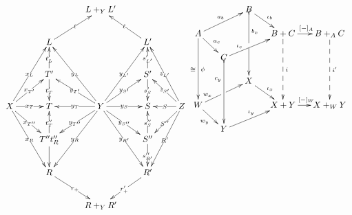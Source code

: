 \documentclass[12pt]{article}
\renewcommand{\(}{\left(}
\renewcommand{\)}{\right)}
\renewcommand{\{}{\left\lbrace}
\renewcommand{\}}{\right\rbrace}
\theoremstyle{remark}
\theoremstyle{definition}
\begin{document}
	\[
	\xymatrix{
		{} &
		{} &
		L+_YL' &
		{} &
		{} \\
		{} &
		L  
		\ar[ru]|{\ell} &
		{} &
		L' 
		\ar[lu]|{\ell}&
		{} \\
		{} &
		T' 
		\ar[u]|{t'_L}
		\ar[d]|{t'_T} &
		{} &
		S' 
		\ar[u]|{s'_{L'}}
		\ar[d]|{s'_S}&
		{} \\
		X 
		\ar[ruu]|{x_L}
		\ar[ru]|{x_{T'}}
		\ar[r]|{x_T}
		\ar[rd]|{x_{T''}}
		\ar[rdd]|{x_R}&
		T &
		Y 
		\ar[luu]|{y_{L}}
		\ar[lu]|{y_{T'}}
		\ar[l]|{y_{T}}
		\ar[ld]|{y_{T''}}
		\ar[ldd]|{y_{R}}
		\ar[ruu]|{y_{L'}}
		\ar[ru]|{y_{S'}}
		\ar[r]|{y_{S}}
		\ar[rd]|{y_{S''}}
		\ar[rdd]|{y_{R'}} &
		S &
		Z 
		\ar[luu]|{z_{L'}}
		\ar[lu]|{z_{S'}}
		\ar[l]|{S}
		\ar[ld]|{S''}
		\ar[ldd]|{R'}\\
		{} &
		T'' 
		\ar[u]|{t''_T}
		\ar[d]{t''_R}&
		{} &
		S'' 
		\ar[u]|{s''_S}
		\ar[d]|{s''_{R'}}&
		{} \\
		{} &
		R 
		\ar[rd]|{r_+}
		{} &
		{} &
		R' 
		\ar[ld]|{r'_+} \\
		{} &
		{} &
		R +_Y R' &
		{} &
		{}
	}
	\xymatrix@C=.2in@R=.2in{
		{} &
		{} &
		{B}
		\ar@{>->}[ddd]^(.3){b_x}|\hole
		\ar[dr]^{\iota_b} &
		{} &
		{} \\
		{A} 
		\ar[ddd]_{\cong}^{\phi}
		\ar[dr]^{a_c}
		\ar[urr]^{a_b} &
		{} &
		{} &
		{B+C} 
		\ar@{-->}[ddd]^{i}
		\ar[r]^{[-]_A} &
		{B+_A C} 
		\ar@{-->}[ddd]^{i'} \\
		{} &
		{C} 
		\ar@{>->}[ddd]_(.3){c_y}
		\ar[urr]^(.3){\iota_c} &
		{} &
		{} &
		{} \\
		{} &
		{} &
		{X} 
		\ar[dr]^{\iota_x} &
		{} &
		{} \\
		{W} 
		\ar[dr]_{w_y}
		\ar[urr]^(.25){w_x}|\hole &
		{} &
		{} &
		{X+Y} 
		\ar[r]^{[-]_W} &
		{X+_WY} \\
		{} &
		{Y} 
		\ar[urr]^{\iota_y} &
		{} &
		{} &
		{} \\
	}
	\]
	
\end{document}
